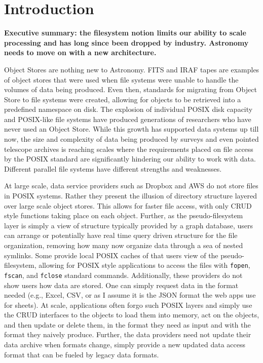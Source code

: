 
\section{Introduction} \label{sec:intro}

\textbf{Executive summary: the filesystem notion limits our ability to scale processing and has long since been dropped by industry. Astronomy needs to move on with a new architecture.}

Object Stores are nothing new to Astronomy.  \gls{FITS} and \gls{IRAF} tapes are examples
of object stores that were used when file systems were unable to handle the volumes
of data being produced. Even then, standards for migrating from Object Store to file
systems were created, allowing for objects to be retrieved into a predefined namespace
on disk.  The explosion of individual \gls{POSIX} disk capacity and \gls{POSIX}-like file systems
have produced generations of researchers who have never used an Object Store. While
this growth has supported data systems up till now, the size and complexity of
data being produced by surveys and even pointed telescope archives is reaching
scales where the requirements placed on file access by the \gls{POSIX} standard are
significantly hindering our ability to work with data.  Different parallel file systems
have different strengths and weaknesses.

At large scale, data service providers such as Dropbox and \gls{AWS} do not store files
in \gls{POSIX} systems.  Rather they present the illusion of directory structure layered over
large scale object stores. This allows for faster file access, with only \gls{CRUD} style
functions taking place on each object.  Further, as the pseudo-filesystem layer is simply a
view of structure typically provided by a graph database, users can arrange or potentially
have real time query driven structure for the file organization, removing how many now
organize data through a sea of nested symlinks.
Some provide local \gls{POSIX} caches of that users view of the
pseudo-filesystem, allowing for \gls{POSIX} style applications to access the files with
\texttt{fopen}, \texttt{fscan}, and \texttt{fclose} standard commands. Additionally, these providers do
not show users how data are stored. One can simply request data in the format
needed (e.g., Excel, \gls{CSV}, or as I assume it is the \gls{JSON} format the web apps
use for sheets).   At scale, applications often forgo
such POSIX layers and simply use the \gls{CRUD} interfaces to the objects to load them into
memory, act on the objects, and then update or delete them, in the format they need
as input and with the format they naively produce. Further, the data providers need
not update their data archive when formats change, simply provide a new updated
data access format that can be fueled by legacy data formats.

